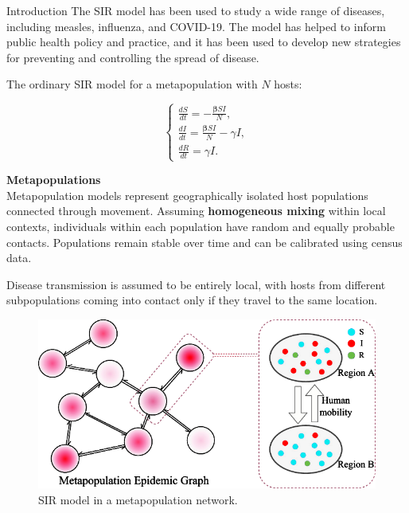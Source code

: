 \documentclass{beamer} %
\begin{document}
\begin{frame}[t]
\begin{columns}[t]
\begin{column}{0.465\textwidth}
\begin{block}{Introduction}
    The SIR model has been used to study a wide range of diseases, including measles, influenza, and COVID-19. The model has helped to inform public health policy and practice, and it has been used to develop new strategies for preventing and controlling the spread of disease.

    \bigskip
    
    The ordinary SIR model for a metapopulation with $N$ hosts:
    
    \begin{center}
    \begin{equation}
    \begin{cases}
        \frac{dS}{dt} = -\frac{{\boldsymbol{\beta}} S I}{N}, \\
        
        \frac{dI}{dt} = \frac{{\boldsymbol{\beta}} S I}{N} - \gamma I, \\
        
        \frac{dR}{dt} = \gamma I.
    \end{cases}
    \end{equation}
    \end{center}
    
    \bigskip
	
	\textbf{Metapopulations} \\
    Metapopulation models represent geographically isolated host populations connected through movement. Assuming \textbf{homogeneous mixing} within local contexts, individuals within each population have random and equally probable contacts. Populations remain stable over time and can be calibrated using census data.

    \bigskip
    
    Disease transmission is assumed to be entirely local, with hosts from different subpopulations coming into contact only if they travel to the same location. 

    \bigskip
    
    \begin{figure}[h!]
        \centering %
        \includegraphics[width=0.47\linewidth]{MetapopSIR.png}
        \caption{SIR model in a metapopulation network.}
    \end{figure}
\end{block}


\end{column}
\end{columns}
\end{frame}
\end{document}
